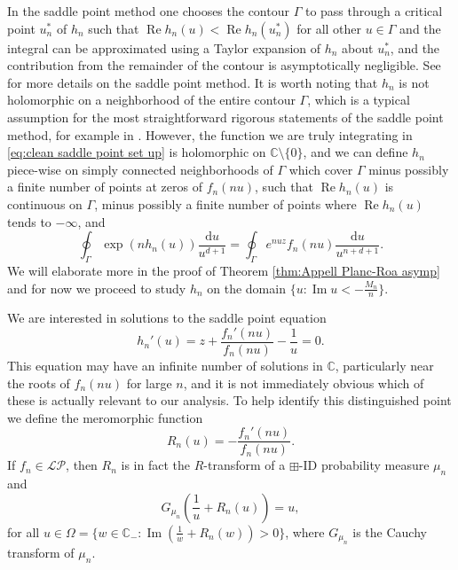 \documentclass[reqno]{amsart}
\newcommand{\1}{\mathbf{1}}
\newcommand{\dd}{\mathrm{d}}
\newcommand{\C}{\mathbb{C}}
\renewcommand\Re{\operatorname{Re}}
\renewcommand\Im{\operatorname{Im}}
\newcommand{\LP}{\mathcal{LP}}
\theoremstyle{plain}
\theoremstyle{definition}
\theoremstyle{remark}
\numberwithin{equation}{section}
\begin{document}
 In the saddle point method one chooses the contour $\Gamma$ to pass through a critical point $u_{n}^*$ of $h_n$ such that $\Re h_n(u)<\Re h_{n}(u_{n}^*)$ for all other $u\in\Gamma$ and the integral can be approximated using a Taylor expansion of $h_n$ about $u_{n}^*$, and the contribution from the remainder of the contour is asymptotically negligible. See \cite{OSullivan2019} for more details on the saddle point method. It is worth noting that $h_n$ is not holomorphic on a neighborhood of the entire contour $\Gamma$, which is a typical assumption for the most straightforward rigorous statements of the saddle point method, for example in \cite[Theorem 1.2]{OSullivan2019}. However, the function we are truly integrating in \eqref{eq:clean saddle point set up} is holomorphic on $\C\setminus\{0\}$, and we can define $h_{n}$ piece-wise on simply connected neighborhoods of $\Gamma$ which cover $\Gamma$ minus possibly a finite number of points at zeros of $f_n(nu)$, such that $\Re h_{n}(u)$ is continuous on $\Gamma$, minus possibly a finite number of points where $\Re h_n(u)$ tends to $-\infty$, and \begin{equation}
 	\oint_{\Gamma}\exp\left(nh_n(u)\right)\frac{\dd u}{u^{d+1}}=\oint_{\Gamma}e^{nuz}f_{n}(nu)\frac{\dd u}{u^{n+d+1}}.
 \end{equation} We will elaborate more in the proof of Theorem \ref{thm:Appell Planc-Roa asymp} and for now we proceed to study $h_n$ on the domain $\{u:\Im u<-\frac{M_n}{n} \}$.


We are interested in solutions to the saddle point equation \begin{equation}\label{eq:clean saddle point equation}
	h_{n}'(u)=z+\frac{f_{n}'(nu)}{f_{n}(nu)}-\frac{1}{u}=0.
\end{equation} This equation may have an infinite number of solutions in $\C$, particularly near the roots of $f_n(nu)$ for large $n$, and it is not immediately obvious which of these is actually relevant to our analysis. To help identify this distinguished point  we define the meromorphic function \begin{equation}\label{eq:clean R transform}
R_n(u)=-\frac{f_{n}'(nu)}{f_n(nu)}.
\end{equation} If $f_{n}\in\LP$, then $R_{n}$ is in fact the $R$-transform of a $\boxplus$-ID probability measure $\mu_{n}$ and \begin{equation}
G_{\mu_{n}}\left(\frac{1}{u}+R_n(u)\right)=u,
\end{equation} for all $u\in\Omega=\{w\in\C_{-}: \Im \left(\frac{1}{w}+R_{n}(w)\right)>0\}$, where $G_{\mu_{n}}$ is the Cauchy transform of $\mu_{n}$. 
\end{document}

